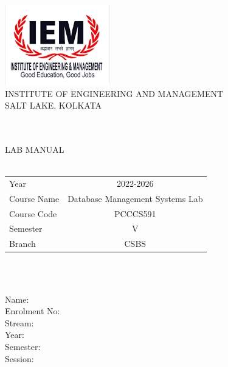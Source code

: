 \documentclass{article}
\begin{document}
\begin{center}
\includegraphics{resources/IEM logo}\\
\uppercase{institute of engineering and management}\\
\uppercase{salt lake, kolkata}\\~\\~\\
\textcolor[HTML]{001F5F}{LAB MANUAL\\~\\
	\begin{tabular}{l@{ : }c}
	Year&2022-2026\\
	Course Name&Database Management Systems Lab\\
	Course Code&PCCCS591\\
	Semester&V\\
	Branch&CSBS\\
	\end{tabular}\\~\\
}
\begin{tcolorbox}
Name:\dotfill\\
Enrolment No:\dotfill\\
Stream:\dotfill\\
Year:\dotfill\\
Semester:\dotfill\\
Session:\dotfill\\
\end{tcolorbox}
\end{center}
\end{document}
